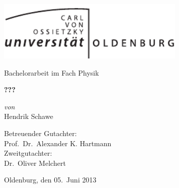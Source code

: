 \begin{titlepage}
\begin{center}

\includegraphics[width=90mm]{images/Uniol_1c.pdf}\\
\vspace{25mm}

{\LARGE  Bachelorarbeit im Fach Physik\\}

\vspace{10mm}

{\LARGE \bfseries
???
\\}

\vspace{20mm}

\begin{minipage}{0.4\textwidth}
\begin{center} \large
\emph{von}\\
\large
Hendrik Schawe\\
\end{center}
\end{minipage}

\vspace{45mm}

{\large
Betreuender Gutachter:\\
Prof.\ Dr.\ Alexander K. Hartmann\\
}
\vspace{8mm}
{\large
Zweitgutachter:\\
Dr.\ Oliver Melchert\\
}

\vfill
{\large Oldenburg, den 05.\ Juni 2013}
\newpage

\end{center}

\end{titlepage}
